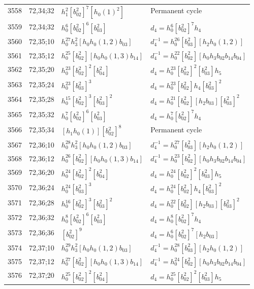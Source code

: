\documentclass{article}
\begin{document}
\begin{longtable}{|l|l|>{\raggedright\arraybackslash}p{6cm}|>{\raggedright\arraybackslash}p{6cm}|}
\hline
3558 & 72,34;32 & $h_1^2[b_{02}^2]^7[h_0(1)^2]$ & Permanent cycle\\
3559 & 72,34;32 & $h_0^6[b_{02}^2]^6[b_{03}^2]$ &$d_{4}=h_0^6[b_{02}^2]^7h_4$\\
\hline
3560 & 72,35;10 & $h_0^{27}h_3^2[h_0h_0(1, 2)b_{03}]$ & $d_{4}^{-1}=h_0^{26}[b_{03}^2][h_2h_0(1, 2)]$\\
\hline
3561 & 72,35;12 & $h_0^{25}[b_{02}^2][h_0h_0(1, 3)b_{14}]$ & $d_{4}^{-1}=h_0^{22}[b_{02}^2][h_0h_3b_{02}b_{14}b_{04}]$\\
\hline
3562 & 72,35;20 & $h_0^{23}[b_{02}^2]^2[b_{04}^2]$ &$d_{4}=h_0^{23}[b_{02}^2]^2[b_{03}^2]h_5$\\
\hline
3563 & 72,35;24 & $h_0^{23}[b_{03}^2]^3$ &$d_{4}=h_0^{23}[b_{02}^2]h_4[b_{03}^2]^2$\\
\hline
3564 & 72,35;28 & $h_0^{15}[b_{02}^2]^3[b_{03}^2]^2$ &$d_{4}=h_0^{21}[b_{02}^2][h_2b_{03}][b_{03}^2]^2$\\
\hline
3565 & 72,35;32 & $h_0^7[b_{02}^2]^6[b_{03}^2]$ &$d_{4}=h_0^7[b_{02}^2]^7h_4$\\
\hline
3566 & 72,35;34 & $[h_1h_0(1)][b_{02}^2]^8$ & Permanent cycle\\
\hline
3567 & 72,36;10 & $h_0^{28}h_3^2[h_0h_0(1, 2)b_{03}]$ & $d_{4}^{-1}=h_0^{27}[b_{03}^2][h_2h_0(1, 2)]$\\
\hline
3568 & 72,36;12 & $h_0^{26}[b_{02}^2][h_0h_0(1, 3)b_{14}]$ & $d_{4}^{-1}=h_0^{23}[b_{02}^2][h_0h_3b_{02}b_{14}b_{04}]$\\
\hline
3569 & 72,36;20 & $h_0^{24}[b_{02}^2]^2[b_{04}^2]$ &$d_{4}=h_0^{24}[b_{02}^2]^2[b_{03}^2]h_5$\\
\hline
3570 & 72,36;24 & $h_0^{24}[b_{03}^2]^3$ &$d_{4}=h_0^{24}[b_{02}^2]h_4[b_{03}^2]^2$\\
\hline
3571 & 72,36;28 & $h_0^{16}[b_{02}^2]^3[b_{03}^2]^2$ &$d_{4}=h_0^{22}[b_{02}^2][h_2b_{03}][b_{03}^2]^2$\\
\hline
3572 & 72,36;32 & $h_0^8[b_{02}^2]^6[b_{03}^2]$ &$d_{4}=h_0^8[b_{02}^2]^7h_4$\\
\hline
3573 & 72,36;36 & $[b_{02}^2]^9$ &$d_{4}=h_0^6[b_{02}^2]^7[h_2b_{03}]$\\
\hline
3574 & 72,37;10 & $h_0^{29}h_3^2[h_0h_0(1, 2)b_{03}]$ & $d_{4}^{-1}=h_0^{28}[b_{03}^2][h_2h_0(1, 2)]$\\
\hline
3575 & 72,37;12 & $h_0^{27}[b_{02}^2][h_0h_0(1, 3)b_{14}]$ & $d_{4}^{-1}=h_0^{24}[b_{02}^2][h_0h_3b_{02}b_{14}b_{04}]$\\
\hline
3576 & 72,37;20 & $h_0^{25}[b_{02}^2]^2[b_{04}^2]$ &$d_{4}=h_0^{25}[b_{02}^2]^2[b_{03}^2]h_5$\\

\end{longtable}
\end{document}
